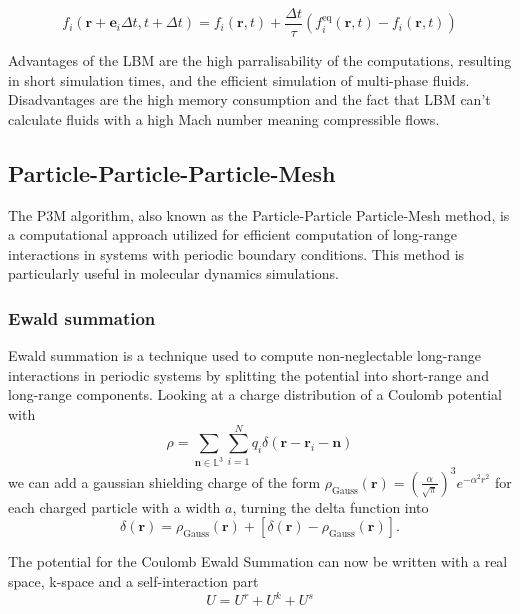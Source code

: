 \begin{equation}
f_i(\mathbf{r} + \mathbf{e}_i \Delta t, t + \Delta t) = f_i(\mathbf{r}, t) + \frac{\Delta t}{\tau} \left( f_i^{\text{eq}}(\mathbf{r}, t) - f_i(\mathbf{r}, t) \right)
\end{equation}

Advantages of the LBM are the high parralisability of the computations, resulting in short simulation times, and the efficient simulation of multi-phase fluids.
Disadvantages are the high memory consumption and the fact that LBM can't calculate fluids with a high Mach number meaning compressible flows.



\subsection{Particle-Particle-Particle-Mesh}

The P3M algorithm, also known as the Particle-Particle Particle-Mesh method, is a computational approach utilized for efficient computation of long-range interactions in systems with periodic boundary conditions. This method is particularly useful in molecular dynamics simulations.

\subsubsection{Ewald summation}
Ewald summation is a technique used to compute non-neglectable long-range interactions in periodic systems by splitting the potential into short-range and long-range components. Looking at a charge distribution of a Coulomb potential with 
\begin{equation}
\rho = \sum_{\mathbf{n} \in \mathbb{L}^3} \sum_{i=1}^{N} q_i \delta(\mathbf{r} - \mathbf{r}_i - \mathbf{n})
\end{equation}
we can add a gaussian shielding charge of the form
$ \rho_{\text{Gauss}}(\mathbf{r}) = \left( \frac{\alpha}{\sqrt{\pi}} \right)^3 e^{-\alpha^2 r^2}$ 
for each charged particle  with a width $a$, turning the delta function into
\begin{equation}
\delta(\mathbf{r}) = \rho_{\text{Gauss}}(\mathbf{r})+ {[\delta(\mathbf{r}) - \rho_{\text{Gauss}}(\mathbf{r})]}.
\end{equation}

The potential for the Coulomb Ewald Summation can now be written with a real space, k-space and a self-interaction part
\begin{equation}
  U = U^{r} + U^{k} + U^{s}
\end{equation}

